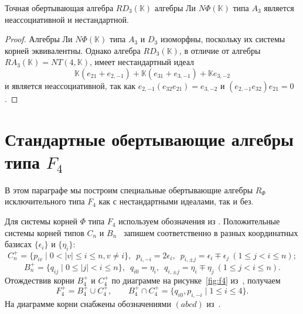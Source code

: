 \documentclass[a4paper,14pt,oneside,openany]{memoir}
\begin{document}
\begin{lemma}\label{l:R-A3-D3}
    Точная обертывающая алгебра $RD_3(\mathbb{K})$ алгебры Ли $N\Phi(\mathbb{K})$
    типа $A_3$ является неассоциативной и нестандартной.
\end{lemma}

\begin{proof}
    Алгебры Ли $N\Phi(\mathbb{K})$ типа $A_3$ и $D_3$ изоморфны, поскольку их
    системы корней эквивалентны. Однако алгебра $RD_3(\mathbb{K})$, в отличие от
    алгебры $RA_3(\mathbb{K})= NT(4,\mathbb{K})$, имеет нестандартный идеал
    \[
        \mathbb{K}(e_{2 1}+ e_{2,-1})+ \mathbb{K}(e_{3 1}+ e_{3,-1})+ \mathbb{K}e_{3,-2}
    \]
    и является неассоциативной, так как $e_{2,-1} (e_{32} e_{21}) = e_{3,-2}$ и
    $(e_{2,-1}e_{32}) e_{21}=0$.
\end{proof}

\section{Стандартные обертывающие алгебры типа \texorpdfstring{$F_4$}{F₄}}\label{sec:F4}
В этом параграфе мы построим специальные обертывающие алгебры $R_\Phi$
исключительного типа $F_4$ как с нестандартными идеалами, так и без.

Для системы корней $\Phi$ типа $F_4$ используем обозначения из \cite{vl90_ru}.
Положительные системы корней типов $C_n$ и $B_n$~\cite[таблицы
I--IV]{bourbaki72} запишем соответственно в разных координатных базисах
$\{\epsilon_i\}$ и $\{\eta_i\}$:
%
\[
    C_n^+ = \{p_{iv} \mid 0 < |v| \leq i \leq n, v \neq i\}, \enspace
    p_{i,-i} = 2\epsilon_i, \enspace
    p_{i,\pm j} = \epsilon_i\mp\epsilon_j\ (1\leq j<i\leq n);
\]
\[
    B_n^+ = \{q_{ij} \mid 0 \leq |j| < i \leq n\}, \enspace
    q_{i0} = \eta_i, \enspace
    q_{i,\pm j} = \eta_i\mp\eta_j\ (1\leq j<i\leq n).
\]
Отождествив корни $B_4^+$ и $C_4^+$ по диаграмме на рисунке~\cref{fig:f4}
из~\cite{vl90_ru}, получаем
\[
    F_4^+=B_4^+\cup C_4^+,\qquad
    B_4^+ \cap C_4^+ = \{q_{i0},p_{i,-i} \mid 1 \leq i \leq 4\}.
\]
На диаграмме корни снабжены обозначениями $(abcd)$ из~\cite[таблица
VIII]{bourbaki72}.
\end{document}
